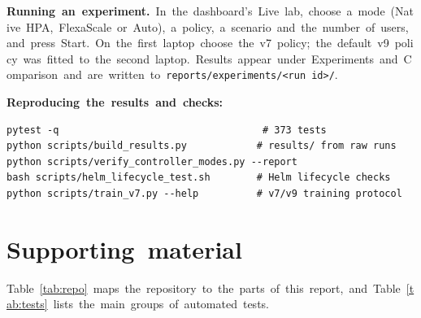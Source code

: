 \documentclass[12pt,a4paper,oneside]{report}
\begin{document}
\textbf{Running~an~experiment.}~In~the~dashboard's~Live~lab,~choose~a~mode~(Native~HPA,~FlexaScale~or~Auto),~a~policy,~a~scenario~and~the~number~of~users,~and~press~Start.~On~the~first~laptop~choose~the~v7~policy;~the~default~v9~policy~was~fitted~to~the~second~laptop.~Results~appear~under~Experiments~and~Comparison~and~are~written~to~\texttt{reports/\allowbreak{}experiments/\allowbreak{}<run~id>/\allowbreak{}}.


\textbf{Reproducing~the~results~and~checks:}


\begin{verbatim}
pytest -q                                   # 373 tests
python scripts/build_results.py            # results/ from raw runs
python scripts/verify_controller_modes.py --report
bash scripts/helm_lifecycle_test.sh        # Helm lifecycle checks
python scripts/train_v7.py --help          # v7/v9 training protocol
\end{verbatim}

\section{Supporting~material}

Table~\ref{tab:repo}~maps~the~repository~to~the~parts~of~this~report,~and~Table~\ref{tab:tests}~lists~the~main~groups~of~automated~tests.
\end{document}
